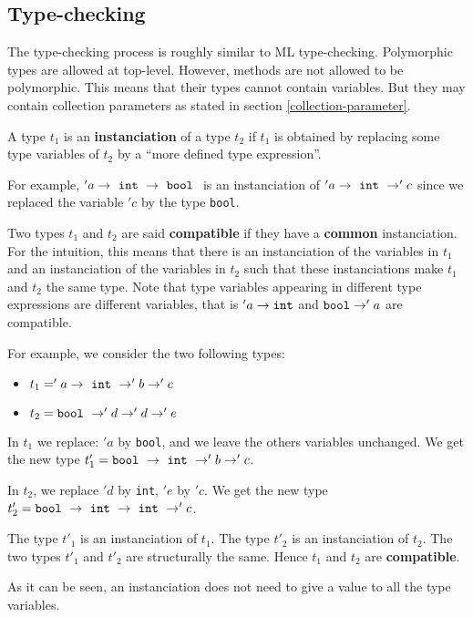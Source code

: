 \subsection{Type-checking}
The type-checking process is roughly similar to ML
type-checking. Polymorphic types are allowed at top-level. However,
methods are not allowed to be polymorphic. This means that their types
cannot contain variables. But they may contain collection parameters
as stated in section \ref{collection-parameter}.

A type $t_1$ is an  {\bf instanciation} of a type $t_2$ if $t_1$ is obtained
by replacing some type variables of $t_2$ by a ``more defined type
expression''.

For example, $'a \rightarrow {\tt\ int\ } \rightarrow {\tt\ bool\ }$
is an instanciation of
$'a \rightarrow {\tt\ int\ } \rightarrow 'c$ since we replaced
the variable $'c$ by the type {\tt bool}.

\smallskip
Two types $t_1$ and $t_2$ are said {\bf compatible}
if they have a {\bf common} instanciation. For the intuition, this
means that there is an instanciation of the variables in $t_1$ and
an instanciation of the variables in $t_2$ such that these instanciations
make $t_1$ and $t_2$ the same type. Note that type variables appearing in
different type expressions are different variables, that is
$'a \to {\tt int}$ and ${\tt bool} \to 'a$ are compatible.

For example, we consider the two following types:
\begin{itemize}
  \item $t_1 = 'a \rightarrow {\tt\ int\ } \rightarrow 'b \rightarrow 'c$
  \item $t_2 = {\tt bool\ } \rightarrow 'd \rightarrow 'd \rightarrow 'e$
\end{itemize}

In $t_1$ we replace: $'a$ by {\tt bool}, and we leave the others
variables unchanged. We get the new type
$t'_1 = {\tt bool\ } \rightarrow {\tt\ int\ } \rightarrow 'b \rightarrow 'c$.

In $t_2$, we replace $'d$ by {\tt int}, $'e$ by $'c$. We get the new
type
$t'_2 = {\tt bool\ } \rightarrow {\tt\ int\ } \rightarrow {\tt\ int\ } \rightarrow 'c$.

The type $t'_1$ is an instanciation of $t_1$. The type $t'_2$ is an
instanciation of $t_2$. The two types $t'_1$ and $t'_2$ are
structurally the same. Hence $t_1$ and $t_2$ are {\bf compatible}.

As it can be seen, an instanciation does not need to give a value to all the
type variables.

